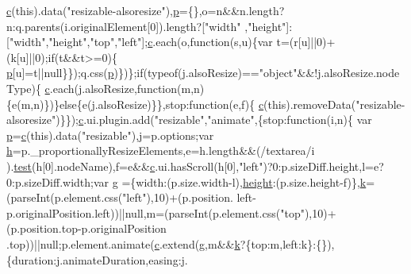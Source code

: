 \begin{DoxyCode}
      \hyperlink{jquery_8js_ad171626e81625b5e9f5cb177a3a8fb1c}{c}(\textcolor{keyword}{this}).data(\textcolor{stringliteral}{"resizable-alsoresize"}),\hyperlink{jquery_8js_a2335e57f79b6acfb6de59c235dc8a83e}{p}=\{\},o=n&&n.length?n:q.parents(i.originalElement[0]).length?[\textcolor{stringliteral}{"width"}
      ,\textcolor{stringliteral}{"height"}]:[\textcolor{stringliteral}{"width"},\textcolor{stringliteral}{"height"},\textcolor{stringliteral}{"top"},\textcolor{stringliteral}{"left"}];\hyperlink{jquery_8js_ad171626e81625b5e9f5cb177a3a8fb1c}{c}.each(o,\textcolor{keyword}{function}(s,u)\{var t=(r[u]||0)+(k[u]||0);\textcolor{keywordflow}{if}(t&&t>=0)\{
      \hyperlink{jquery_8js_a2335e57f79b6acfb6de59c235dc8a83e}{p}[u]=t||null\}\});q.css(\hyperlink{jquery_8js_a2335e57f79b6acfb6de59c235dc8a83e}{p})\})\};\textcolor{keywordflow}{if}(typeof(j.alsoResize)==\textcolor{stringliteral}{"object"}&&!j.alsoResize.nodeType)\{
      \hyperlink{jquery_8js_ad171626e81625b5e9f5cb177a3a8fb1c}{c}.each(j.alsoResize,\textcolor{keyword}{function}(m,n)\{e(m,n)\})\}\textcolor{keywordflow}{else}\{e(j.alsoResize)\}\},stop:\textcolor{keyword}{function}(e,f)\{
      \hyperlink{jquery_8js_ad171626e81625b5e9f5cb177a3a8fb1c}{c}(\textcolor{keyword}{this}).removeData(\textcolor{stringliteral}{"resizable-alsoresize"})\}\});\hyperlink{jquery_8js_ad171626e81625b5e9f5cb177a3a8fb1c}{c}.ui.plugin.add(\textcolor{stringliteral}{"resizable"},\textcolor{stringliteral}{"animate"},\{stop:\textcolor{keyword}{function}(i,n)\{
      var \hyperlink{jquery_8js_a2335e57f79b6acfb6de59c235dc8a83e}{p}=\hyperlink{jquery_8js_ad171626e81625b5e9f5cb177a3a8fb1c}{c}(\textcolor{keyword}{this}).data(\textcolor{stringliteral}{"resizable"}),j=p.options;var \hyperlink{all__1a_8js_aebecdaf2444e2be39f4804412d6a3bf8}{h}=p.\_proportionallyResizeElements,e=h.length&&(/textarea/i
      ).\hyperlink{inv__mpu_8c_a1e8f8b1ef7fb2c429e1ce7c2f9985530}{test}(h[0].nodeName),f=e&&\hyperlink{jquery_8js_ad171626e81625b5e9f5cb177a3a8fb1c}{c}.ui.hasScroll(h[0],\textcolor{stringliteral}{"left"})?0:p.sizeDiff.height,l=e?0:p.sizeDiff.width;var g
      =\{width:(p.size.width-l),\hyperlink{styr_2styr_2main_8c_a48083b65ac9a863566dc3e3fff09a5b4}{height}:(p.size.height-f)\},\hyperlink{jquery_8js_ab26645c014aa005ecedef329ecf58c99}{k}=(parseInt(p.element.css(\textcolor{stringliteral}{"left"}),10)+(p.position.
      left-p.originalPosition.left))||null,m=(parseInt(p.element.css(\textcolor{stringliteral}{"top"}),10)+(p.position.top-p.originalPosition
      .top))||null;p.element.animate(\hyperlink{jquery_8js_ad171626e81625b5e9f5cb177a3a8fb1c}{c}.extend(g,m&&\hyperlink{jquery_8js_ab26645c014aa005ecedef329ecf58c99}{k}?\{top:m,left:k\}:\{\}),\{duration:j.animateDuration,easing:j.

\end{DoxyCode}
